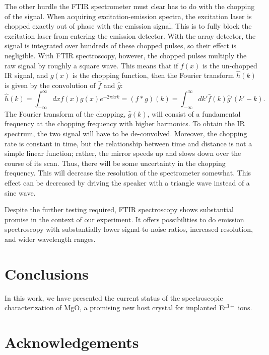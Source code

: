 \documentclass[12pt]{report}
\newcommand{\erbium}[1][ ]{Er$^{3+}$#1}
\renewcommand{\bibname}{References}
\begin{document}
The other hurdle the FTIR spectrometer must clear has to do with the chopping of the signal. When acquiring excitation-emission spectra, the excitation laser is chopped exactly out of phase with the emission signal. This is to fully block the excitation laser from entering the emission detector. With the array detector, the signal is integrated over hundreds of these chopped pulses, so their effect is negligible. With FTIR spectroscopy, however, the chopped pulses multiply the raw signal by roughly a square wave. This means that if $f(x)$ is the un-chopped IR signal, and $g(x)$ is the chopping function, then the Fourier transform $\hat{h}(k)$ is given by the convolution of $\hat{f}$ and $\hat{g}$:
\begin{equation}\label{eq:15}
\hat{h}(k) = \int_{-\infty}^{\infty}dxf(x)g(x)e^{-2\pi i x k} = (f * g)(k) = \int_{-\infty}^{\infty}dk'\hat{f}(k)\hat{g}'(k'-k).
\end{equation}
The Fourier transform of the chopping, $\hat{g}(k)$, will consist of a fundamental frequency at the chopping frequency with higher harmonics. To obtain the IR spectrum, the two signal will have to be de-convolved. Moreover, the chopping rate is constant in time, but the relationship between time and distance is not a simple linear function; rather, the mirror speeds up and slows down over the course of its scan. Thus, there will be some uncertainty in the chopping frequency. This will decrease the resolution of the spectrometer somewhat. This effect can be decreased by driving the speaker with a triangle wave instead of a sine wave.

Despite the further testing required, FTIR spectroscopy shows substantial promise in the context of our experiment. It offers possibilities to do emission spectroscopy with substantially lower signal-to-noise ratios, increased resolution, and wider wavelength ranges.



\chapter{Conclusions}

In this work, we have presented the current status of the spectroscopic characterization of MgO, a promising new host crystal for implanted \erbium ions. 


\renewcommand{\bibname}{References}
\singlespacing

\cleardoublepage
\ifdefined{}
\else
\fi
{}


\newpage
{}
\chapter*{Acknowledgements}
\end{document}
